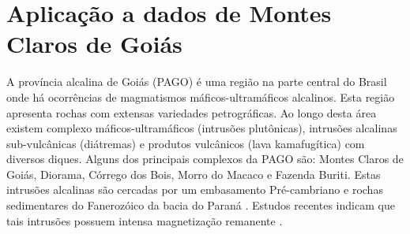 \chapter{Aplicação a dados de Montes Claros de Goiás}
\label{sec:real_application}

A província alcalina de Goiás (PAGO) é uma região na parte central do Brasil onde há ocorrências de magmatismos máficos-ultramáficos alcalinos. Esta região apresenta rochas com extensas variedades petrográficas. Ao longo desta área existem complexo máficos-ultramáficos (intrusões plutônicas), intrusões alcalinas sub-vulcânicas (diátremas) e produtos vulcânicos (lava kamafugítica) com diversos diques. Alguns dos principais complexos da PAGO são: Montes Claros de Goiás, Diorama, Córrego dos Bois, Morro do Macaco e Fazenda Buriti. Estas intrusões alcalinas são cercadas por um embasamento Pré-cambriano e rochas sedimentares do Fanerozóico da bacia do Paraná \citep{junqueira_brod_2005,carlson_etal_2007,marangoni_mantovani_2013,dutra_etal_2014}. Estudos recentes indicam que tais intrusões 
possuem intensa magnetização remanente \citep{marangoni_mantovani_2013,oliveirajr_etal_2015,marangoni_etal_2016,zhang_etal_2018}.

